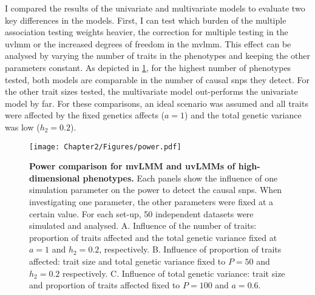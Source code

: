 I compared the results of the univariate and multivariate models to evaluate  two key differences in the models. First, I can test which burden of the multiple association testing weights heavier, the correction for multiple testing in the \gls{uvlmm} or the increased degrees of freedom in the \gls{mvlmm}. This effect can be analysed by varying the number of traits in the phenotypes and keeping the other parameters constant. As depicted in \cref{fig:power}, for the highest number of phenotypes tested, both models are comparable in the number of causal \glspl{snp} they detect. For the other trait sizes tested, the multivariate model out-performs the univariate model by far. For these comparisons, an ideal scenario was assumed and all traits were affected by the fixed genetics affects (\(a=1\)) and the total genetic variance was low (\(h_2=0.2\)). 
%
\begin{figure}[hbtp]
	\centering
	\texttt{[image: Chapter2/Figures/power.pdf]}
	\caption[\textbf{Power comparison for mvLMM and uvLMMs of high-dimensional phenotypes.}]{\textbf{Power comparison for mvLMM and uvLMMs of high-dimensional phenotypes.} Each panels show the influence of one simulation parameter on the power to detect the causal \glspl{snp}. When investigating one parameter, the other parameters were fixed at a certain value. For each set-up, 50 independent datasets were simulated and analysed. A. Influence of the number of traits: proportion of traits affected and the total genetic variance fixed at \(a=1\) and \(h_2=0.2\), respectively. B. Influence of proportion of traits affected: trait size and total genetic variance fixed to \(P=50\) and \(h_2=0.2\) respectively. C. Influence of total genetic variance:  trait size and  proportion of traits affected fixed to \(P=100\) and \(a=0.6\).} 
 	\label{fig:power}
\end{figure}

